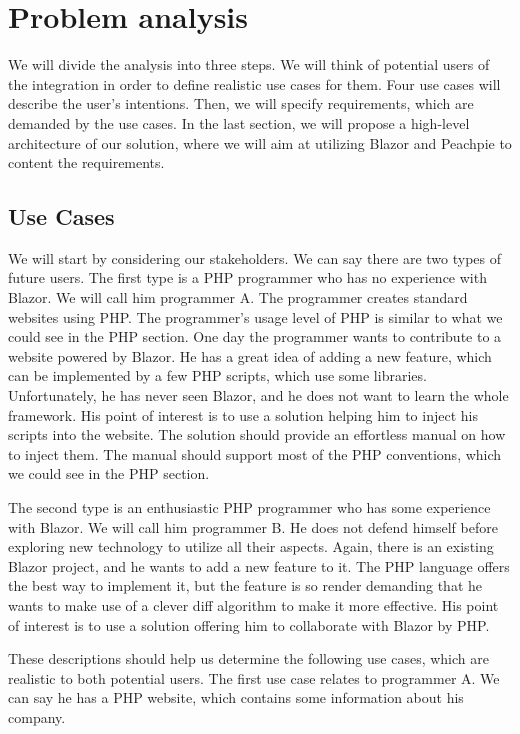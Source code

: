 \chapter{Problem analysis}

We will divide the analysis into three steps.
We will think of potential users of the integration in order to define realistic use cases for them.
Four use cases will describe the user's intentions.
Then, we will specify requirements, which are demanded by the use cases.
In the last section, we will propose a high-level architecture of our solution, where we will aim at utilizing Blazor and Peachpie to content the requirements.

\section{Use Cases}
We will start by considering our stakeholders.
We can say there are two types of future users.
The first type is a PHP programmer who has no experience with Blazor.
We will call him programmer A.
The programmer creates standard websites using PHP.
The programmer's usage level of PHP is similar to what we could see in the PHP section. 
One day the programmer wants to contribute to a website powered by Blazor.
He has a great idea of adding a new feature, which can be implemented by a few PHP scripts, which use some libraries.
Unfortunately, he has never seen Blazor, and he does not want to learn the whole framework.
His point of interest is to use a solution helping him to inject his scripts into the website.
The solution should provide an effortless manual on how to inject them.
The manual should support most of the PHP conventions, which we could see in the PHP section.
\par
The second type is an enthusiastic PHP programmer who has some experience with Blazor.
We will call him programmer B.
He does not defend himself before exploring new technology to utilize all their aspects.
Again, there is an existing Blazor project, and he wants to add a new feature to it.
The PHP language offers the best way to implement it, but the feature is so render demanding that he wants to make use of a clever diff algorithm to make it more effective.
His point of interest is to use a solution offering him to collaborate with Blazor by PHP.
\par
These descriptions should help us determine the following use cases, which are realistic to both potential users.
The first use case relates to programmer A.
We can say he has a PHP website, which contains some information about his company.
